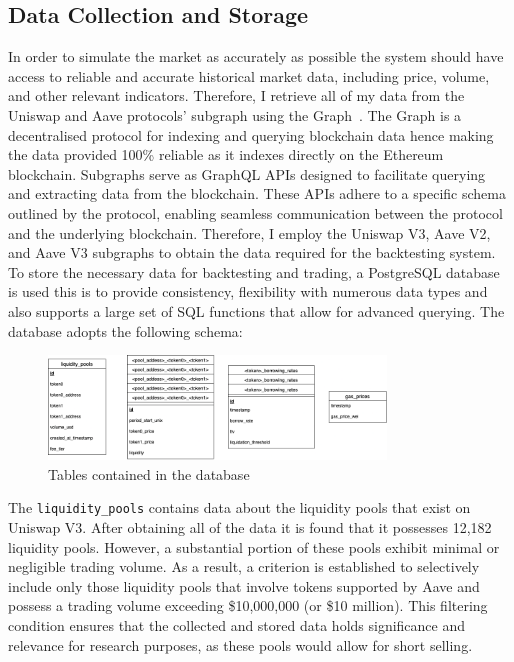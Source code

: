 \subsection{Data Collection and Storage}
In order to simulate the market as accurately as possible the system should have access to reliable and accurate historical market data, including price, volume, and other relevant indicators. Therefore, I retrieve all of my data from the Uniswap and Aave protocols' subgraph using the Graph~\cite{noauthor_graph_nodate}. The Graph is a decentralised protocol for indexing and querying blockchain data hence making the data provided 100\% reliable as it indexes directly on the Ethereum blockchain. Subgraphs serve as GraphQL APIs designed to facilitate querying and extracting data from the blockchain. These APIs adhere to a specific schema outlined by the protocol, enabling seamless communication between the protocol and the underlying blockchain. Therefore, I employ the Uniswap V3, Aave V2, and Aave V3 subgraphs to obtain the data required for the backtesting system.
\\[5mm]
To store the necessary data for backtesting and trading, a PostgreSQL database is used this is to provide consistency, flexibility with numerous data types and also supports a large set of SQL functions that allow for advanced querying. The database adopts the following schema:
\begin{figure}[!htb]
    \centering
    \includegraphics[width=0.8\textwidth]{project/Images/database_tables.png}
    \caption{Tables contained in the database \label{fig:database}}
\end{figure}
The \texttt{liquidity\_pools} contains data about the liquidity pools that exist on Uniswap V3. After obtaining all of the data it is found that it possesses 12,182 liquidity pools. However, a substantial portion of these pools exhibit minimal or negligible trading volume. As a result, a criterion is established to selectively include only those liquidity pools that involve tokens supported by Aave and possess a trading volume exceeding \$10,000,000 (or \$10 million). This filtering condition ensures that the collected and stored data holds significance and relevance for research purposes, as these pools would allow for short selling.

